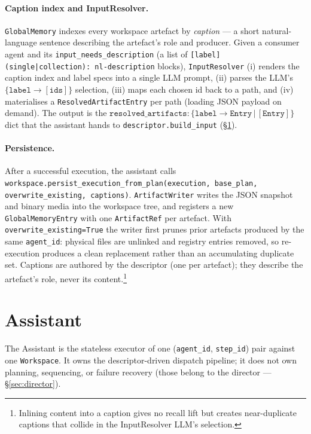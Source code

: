 \paragraph{Caption index and InputResolver.}
\texttt{GlobalMemory} indexes every workspace artefact by
\emph{caption} — a short natural-language sentence describing the
artefact's role and producer. Given a consumer agent and its
\texttt{input\_needs\_description} (a list of
\texttt{[label] (single|collection): nl-description} blocks),
\texttt{InputResolver} (i) renders the caption index and label specs
into a single LLM prompt, (ii) parses the LLM's
$\{\texttt{label}\!\to\![\texttt{ids}]\}$ selection, (iii) maps each
chosen id back to a path, and (iv) materialises a
\texttt{ResolvedArtifactEntry} per path (loading JSON payload on
demand). The output is the
$\texttt{resolved\_artifacts}\!:\!\{\texttt{label}\!\to\!\texttt{Entry}\,|\,[\texttt{Entry}]\}$
dict that the assistant hands to \texttt{descriptor.build\_input}
(\S\ref{sec:assistant}).

\paragraph{Persistence.}
After a successful execution, the assistant calls
\texttt{workspace.persist\_execution\_from\_plan(execution, base\_plan,
overwrite\_existing, captions)}. \texttt{ArtifactWriter} writes the JSON
snapshot and binary media into the workspace tree, and registers a new
\texttt{GlobalMemoryEntry} with one \texttt{ArtifactRef} per artefact.
With \texttt{overwrite\_existing=True} the writer first prunes prior
artefacts produced by the same \texttt{agent\_id}: physical files are
unlinked and registry entries removed, so re-execution produces a clean
replacement rather than an accumulating duplicate set. Captions are
authored by the descriptor (one per artefact); they describe the
artefact's role, never its content.\footnote{Inlining content into a
caption gives no recall lift but creates near-duplicate captions that
collide in the InputResolver LLM's selection.}


\section{Assistant}
\label{sec:assistant}

The Assistant is the stateless executor of one (\texttt{agent\_id},
\texttt{step\_id}) pair against one \texttt{Workspace}. It owns the
descriptor-driven dispatch pipeline; it does not own planning,
sequencing, or failure recovery (those belong to the director —
\S\ref{sec:director}).

